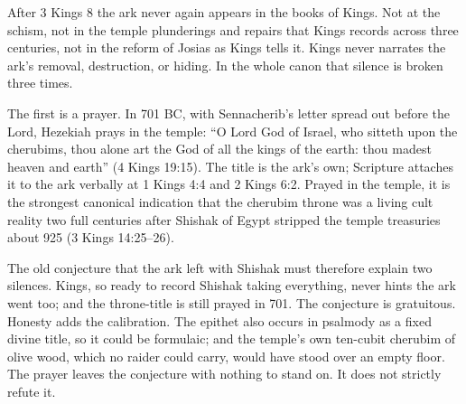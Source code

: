 After 3 Kings 8 the ark never again appears in the books of Kings. Not at
the schism, not in the temple plunderings and repairs that Kings records
across three centuries, not in the reform of Josias as Kings tells it. Kings
never narrates the ark's removal, destruction, or hiding. In the whole canon
that silence is broken three times.

The first is a prayer. In 701 BC, with Sennacherib's letter spread out before
the Lord, Hezekiah prays in the temple: ``O Lord God of Israel, who sitteth
upon the cherubims, thou alone art the God of all the kings of the earth:
thou madest heaven and earth'' (4 Kings 19:15). The title is
the ark's own; Scripture attaches it to the ark verbally at 1 Kings 4:4 and
2 Kings 6:2. Prayed in the temple, it is the strongest canonical indication
that the cherubim throne was a living cult reality two full centuries after
Shishak of Egypt stripped the temple treasuries about 925 (3 Kings
14:25--26).

The old conjecture that the ark left with Shishak must therefore explain
two silences. Kings, so ready to record Shishak taking everything, never
hints the ark went too; and the throne-title is still prayed in 701. The
conjecture is gratuitous. Honesty adds the calibration. The epithet also
occurs in psalmody as a fixed divine title, so it could be formulaic; and
the temple's own ten-cubit cherubim of olive wood, which no raider could
carry, would have stood over an empty floor. The prayer leaves the
conjecture with nothing to stand on. It does not strictly refute
it.

